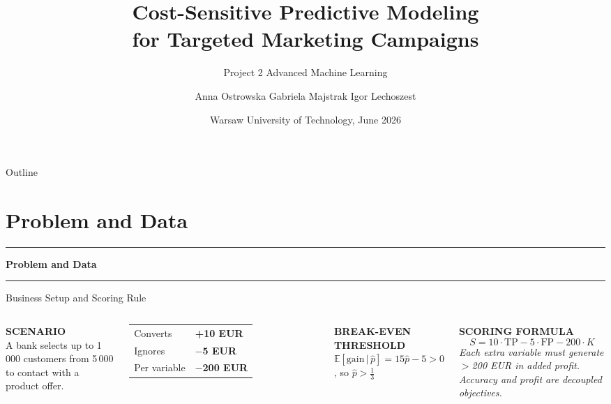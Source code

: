\documentclass[aspectratio=169,10pt]{beamer}
\title{Cost-Sensitive Predictive Modeling\\for Targeted Marketing Campaigns}
\subtitle{Project 2 \textperiodcentered{} Advanced Machine Learning}
\author{Anna Ostrowska \textperiodcentered{} Gabriela Majstrak \textperiodcentered{} Igor Lechoszest}
\date{Warsaw University of Technology, June 2026}
\newcommand{\sectionslide}[1]{%
  \begin{frame}[plain]
    \centering\vfill
    \textcolor{mid}{\rule{0.10\textwidth}{0.3pt}}\par\vspace{0.5em}
    {\large\bfseries #1}\par\vspace{0.5em}
    \textcolor{mid}{\rule{0.10\textwidth}{0.3pt}}
    \vfill
  \end{frame}%
}
\newcommand{\slabel}[1]{\textbf{\tiny\MakeUppercase{#1}}\\[0.25em]}
\begin{document}
\begin{frame}[plain]
\titlepage
\end{frame}

\begin{frame}{Outline}
\tableofcontents
\end{frame}

\section{Problem and Data}
\sectionslide{Problem and Data}

\begin{frame}{Business Setup and Scoring Rule}
\begin{columns}[T]

\slabel{Scenario}
A bank selects up to 1\,000 customers from 5\,000 to contact with a product offer.

\vspace{0.4em}
\begin{tabular}{@{}ll@{}}
  Converts  & \textbf{+10 EUR} \\[0.15em]
  Ignores   & \textbf{$-$5 EUR} \\[0.15em]
  Per variable & \textbf{$-$200 EUR} \\
\end{tabular}

\vspace{0.5em}
\slabel{Break-even threshold}
$\mathbb{E}[\text{gain}\,|\,\hat{p}] = 15\hat{p} - 5 > 0$, so $\hat{p} > \tfrac{1}{3}$


\slabel{Scoring formula}
\[
  S = 10\cdot\mathrm{TP} - 5\cdot\mathrm{FP} - 200\cdot K
\]
\vspace{0.2em}
{\footnotesize\itshape Each extra variable must generate $>$200 EUR in added profit. Accuracy and profit are decoupled objectives.}

\end{columns}
\end{frame}
\end{document}
